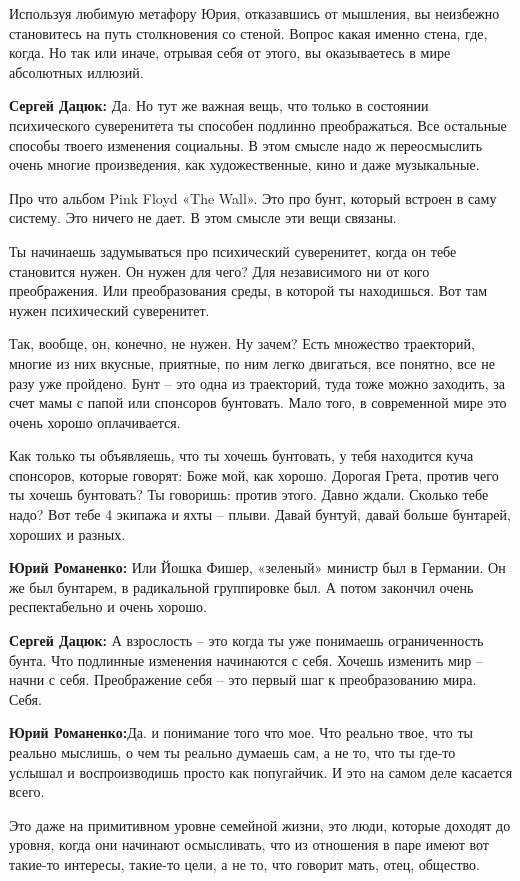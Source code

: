Используя любимую метафору Юрия, отказавшись от мышления, вы неизбежно
становитесь на путь столкновения со стеной. Вопрос какая именно стена, где,
когда. Но так или иначе, отрывая себя от этого, вы оказываетесь в мире
абсолютных иллюзий.

\textbf{Сергей Дацюк:} Да. Но тут же важная вещь, что только в состоянии психического
суверенитета ты способен подлинно преображаться. Все остальные способы твоего
изменения социальны. В этом смысле надо ж переосмыслить очень многие
произведения, как художественные, кино и даже музыкальные.

Про что альбом Pink Floyd «The Wall». Это про бунт, который встроен в саму
систему. Это ничего не дает. В этом смысле эти вещи связаны.

Ты начинаешь задумываться про психический суверенитет, когда он тебе становится
нужен. Он нужен для чего? Для независимого ни от кого преображения. Или
преобразования среды, в которой ты находишься. Вот там нужен психический
суверенитет.

Так, вообще, он, конечно, не нужен. Ну зачем? Есть множество траекторий, многие
из них вкусные, приятные, по ним легко двигаться, все понятно, все не разу уже
пройдено. Бунт – это одна из траекторий, туда тоже можно заходить, за счет мамы
с папой или спонсоров бунтовать. Мало того, в современной мире это очень хорошо
оплачивается.

Как только ты объявляешь, что ты хочешь бунтовать, у тебя находится куча
спонсоров, которые говорят: Боже мой, как хорошо. Дорогая Грета, против чего ты
хочешь бунтовать? Ты говоришь: против этого. Давно ждали. Сколько тебе надо?
Вот тебе 4 экипажа и яхты – плыви. Давай бунтуй, давай больше бунтарей, хороших
и разных.

\textbf{Юрий Романенко:} Или Йошка Фишер, «зеленый» министр был в Германии. Он же был
бунтарем, в радикальной группировке был. А потом закончил очень респектабельно
и очень хорошо.

\textbf{Сергей Дацюк:} А взрослость – это когда ты уже понимаешь ограниченность бунта.
Что подлинные изменения начинаются с себя. Хочешь изменить мир – начни с себя.
Преображение себя – это первый шаг к преобразованию мира. Себя.

\textbf{Юрий Романенко:}Да. и понимание того что мое. Что реально твое, что ты реально
мыслишь, о чем ты реально думаешь сам, а не то, что ты где-то услышал и
воспроизводишь просто как попугайчик. И это на самом деле касается всего.

Это даже на примитивном уровне семейной жизни, это люди, которые доходят до
уровня, когда они начинают осмысливать, что из отношения в паре имеют вот
такие-то интересы, такие-то цели, а не то, что говорит мать, отец, общество.

